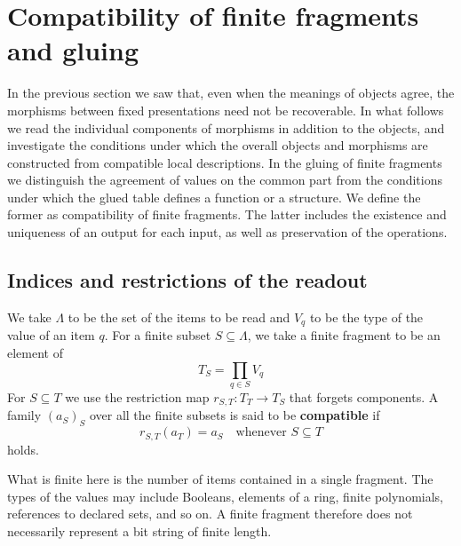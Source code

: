 \section{Compatibility of finite fragments and gluing}\label{sec:8.2}

In the previous section we saw that, even when the meanings of objects agree, the morphisms
between fixed presentations need not be recoverable.
In what follows we read the individual components of morphisms in addition to the objects,
and investigate the conditions under which the overall objects and morphisms are constructed
from compatible local descriptions.
In the gluing of finite fragments we distinguish the agreement of values on the common part
from the conditions under which the glued table defines a function or a structure.
We define the former as compatibility of finite fragments.
The latter includes the existence and uniqueness of an output for each input, as well as
preservation of the operations.

\subsection*{Indices and restrictions of the readout}

\begin{definition}\label{def:8.6}

We take $\Lambda$ to be the set of the items to be read and $V_q$ to be the type of the value
of an item $q$.
For a finite subset $S\subseteq\Lambda$, we take a finite fragment to be an element of
\begin{equation*}
T_S=\prod_{q\in S}V_q
\tag{8.5}\label{eq:8.5}
\end{equation*}
For $S\subseteq T$ we use the restriction map $r_{S,T}:T_T\to T_S$ that forgets components.
A family $(a_S)_S$ over all the finite subsets is said to be \textbf{compatible} if
\begin{equation*}
r_{S,T}(a_T)=a_S
\quad\text{whenever }S\subseteq T
\tag{8.6}\label{eq:8.6}
\end{equation*}
holds.

What is finite here is the number of items contained in a single fragment.
The types of the values may include Booleans, elements of a ring, finite polynomials,
references to declared sets, and so on.
A finite fragment therefore does not necessarily represent a bit string of finite length.

\end{definition}

